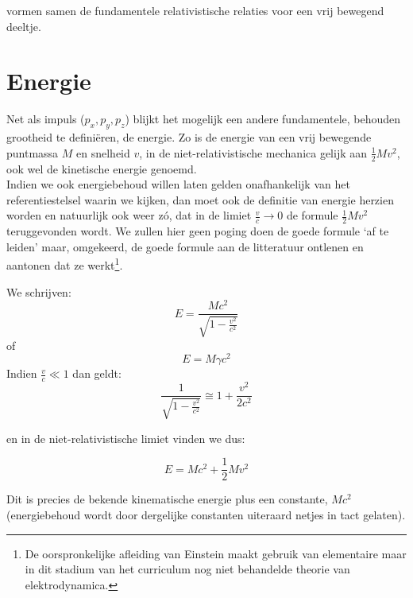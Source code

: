 vormen samen de fundamentele relativistische relaties voor een vrij
bewegend deeltje.

\section{Energie}
Net als impuls ($p_{x}, p_{y}, p_{z}$) blijkt het mogelijk een andere
fundamentele, behouden grootheid te defini\"{e}ren, de energie.
Zo is de energie van een vrij bewegende puntmassa $M$ en snelheid $v$,
in de niet-relativistische mechanica gelijk aan $\frac{1}{2}Mv^{2}$, ook
wel de kinetische energie genoemd.\\
Indien we ook energiebehoud willen laten gelden onafhankelijk
van het referentiestelsel waarin we kijken, dan moet ook
de definitie van energie herzien worden en natuurlijk ook weer z\'{o},
dat in de limiet $\frac{v}{c} \rightarrow 0$ de formule
$\frac{1}{2}Mv^{2}$ teruggevonden wordt.
We zullen hier geen poging doen de goede formule `af te leiden'
maar, omgekeerd, de goede formule aan de litteratuur ontlenen en aantonen
dat ze werkt\footnote{De oorspronkelijke afleiding van Einstein maakt gebruik van 
elementaire maar in dit stadium van het curriculum nog niet behandelde
theorie van elektrodynamica.}.

We schrijven:
\begin{displaymath}
E = \frac{Mc^{2}} {\sqrt{1 - \frac{v^{2}} {c^{2}} }}
\end{displaymath}
of
\begin{equation}
\label{v:energie}
E = M\gamma c^{2}
\end{equation}
Indien $\frac{v}{c} \ll 1$ dan geldt:
\begin{displaymath}
\frac{1} {\sqrt{1 - \frac{v^{2}} {c^{2}}}}
\cong 1 + \frac{v^{2}} {2c^{2}}
\end{displaymath}

en in de niet-relativistische limiet vinden we dus:

\begin{displaymath}
E = Mc^{2} + \frac{1}{2}Mv^{2}
\end{displaymath}

Dit is precies de bekende kinematische energie plus een constante,
$Mc^{2}$ (energiebehoud wordt door dergelijke constanten uiteraard netjes 
in tact gelaten).

